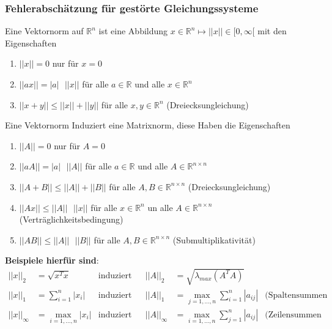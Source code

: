 \documentclass[
	ngerman,
	accentcolor=9c,%
	type=intern,
	marginpar=false
	]{tudapub}
\begin{document}
        \subsubsection{Fehlerabschätzung für gestörte Gleichungssysteme}
            \begin{definition}
                Eine Vektornorm auf $\mathbb{R}^n$ ist eine Abbildung $x \in \mathbb{R}^n \mapsto ||x|| \in [0,\infty[$ mit den Eigenschaften
                \begin{enumerate}[label=\alph*)]
                    \item $||x|| = 0$ nur für $x = 0$
                    \item $||ax|| = |a|\mbox{ }||x||$ für alle $a \in \mathbb{R}$ und alle $x \in \mathbb{R}^n$
                    \item $||x+y|| \leq ||x|| + ||y||$ für alle $x,y \in \mathbb{R}^n$ (Dreiecksungleichung) 
                \end{enumerate}
            \end{definition}\newpage
            \begin{definition}
                Eine Vektornorm Induziert eine Matrixnorm, diese Haben die Eigenschaften
                \begin{enumerate}[label=\alph*)]
                    \item $||A|| = 0$ nur für $A = 0$
                    \item $||aA|| = |a|\mbox{ }||A||$ für alle $a \in \mathbb{R}$ und alle $A \in \mathbb{R}^{n \times n}$
                    \item $||A+B|| \leq ||A|| + ||B||$ für alle $A,B \in \mathbb{R}^{n\times n}$ (Dreiecksungleichung) 
                    \item $||Ax|| \leq ||A|| \mbox{ } ||x||$ für alle $x \in \mathbb{R}^n$ un alle $A \in \mathbb{R}^{n \times n}$ (Verträglichkeitsbedingung)
                    \item $||AB|| \leq ||A|| \mbox{ }||B||$ für alle $A,B \in \mathbb{R}^{n\times n}$ (Submultiplikativität)
                \end{enumerate}
                \textbf{Beispiele hierfür sind}:
                \begin{align*}
                    ||x||_2 &= \sqrt{x^Tx} & \text{induziert} &&||A||_2 &= \sqrt{\lambda_{max}(A^TA)}\\
                    ||x||_1 &= \sum^n_{i=1}|x_i| & \text{induziert} && ||A||_1 &= \max_{j=1,\dots,n} \sum^n_{i=1} |a_{ij}| & \text{(Spaltensummen Norm = ``größte'' Spalte)}\\
                    ||x||_\infty &= \max_{i=1,\dots,n}|x_i| & \text{induziert} && ||A||_\infty &= \max_{i=1,\dots,n} \sum^n_{j=1} |a_{ij}| & \text{(Zeilensummen Norm = ``größte'' Zeile)}\\
                \end{align*}
            \end{definition}
\end{document}
